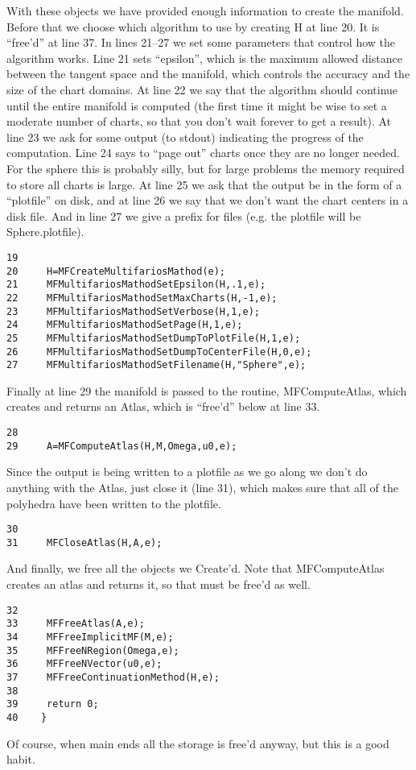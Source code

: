 \documentclass[12pt]{article}
\begin{document}
With these objects we have provided enough information to create the manifold.
Before that we choose which algorithm to use by creating H at line 20. It is
``free'd'' at line 37. In lines 21--27 we set some parameters that control how
the algorithm works. Line 21 sets ``epsilon'', which is the maximum allowed
distance between the tangent space and the manifold, which controls the 
accuracy and the size of the chart domains. At line 22 we say that the algorithm
should continue until the entire manifold is computed (the first time it might
be wise to set a moderate number of charts, so that you don't wait forever
to get a result). At line 23 we ask for some output (to stdout) indicating
the progress of the computation. Line 24 says to ``page out'' charts once they
are no longer needed. For the sphere this is probably silly, but for large 
problems the memory required to store all charts is large. At line 25 we
ask that the output be in the form of a ``plotfile'' on disk, and at line 26 
we say that we don't want the chart centers in a disk file. And in line 27 
we give a prefix for files (e.g. the plotfile will be Sphere.plotfile).
\begin{verbatim}
19   
20     H=MFCreateMultifariosMathod(e);
21     MFMultifariosMathodSetEpsilon(H,.1,e);
22     MFMultifariosMathodSetMaxCharts(H,-1,e);
23     MFMultifariosMathodSetVerbose(H,1,e);
24     MFMultifariosMathodSetPage(H,1,e);
25     MFMultifariosMathodSetDumpToPlotFile(H,1,e);
26     MFMultifariosMathodSetDumpToCenterFile(H,0,e);
27     MFMultifariosMathodSetFilename(H,"Sphere",e);
\end{verbatim}
Finally at line 29 the manifold is passed to the routine, {MFComputeAtlas}, 
which creates and returns an Atlas, which is ``free'd'' below at line 33.
\begin{verbatim}
28   
29     A=MFComputeAtlas(H,M,Omega,u0,e);
\end{verbatim}
Since the
output is being written to a plotfile as we go along we don't do anything
with the Atlas, just close it (line 31), which makes sure that all of the 
polyhedra have been written to the plotfile.
\begin{verbatim}
30   
31     MFCloseAtlas(H,A,e);
\end{verbatim}
And finally, we free all the objects we {Create}'d. Note that {MFComputeAtlas} creates
an atlas and returns it, so that must be free'd as well.
\begin{verbatim}
32   
33     MFFreeAtlas(A,e);
34     MFFreeImplicitMF(M,e);
35     MFFreeNRegion(Omega,e);
36     MFFreeNVector(u0,e);
37     MFFreeContinuationMethod(H,e);
38   
39     return 0;
40    }
\end{verbatim}
Of course, when {main} ends all the storage is free'd anyway, but this is a good habit.
\end{document}
